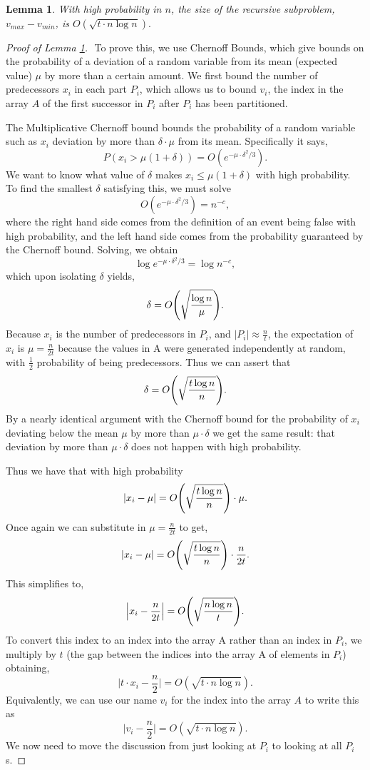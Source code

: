 \documentclass[twocolumn, twoside, 12pt]{article}
\DeclarePairedDelimiter{\paren}{(}{)}
\renewcommand{\paragraph}[1]{\vspace{0.09in}\noindent{\bf \boldmath #1.}}
\newtheorem{lemma}{Lemma}
\begin{document}
\begin{lemma}
With high probability in $n$, the size of the recursive subproblem, $v_{max} - v_{min}$, is $O(\sqrt{t\cdot n\log n}).$
\label{lem:epsSmallFP}
\end{lemma}

\begin{proof}[Proof of Lemma \ref{lem:epsSmallFP}]
$ $\newline
\paragraph{A Single $P_i$}
To prove this, we use Chernoff Bounds, which give bounds on the probability of a deviation of a random variable from its mean (expected value) $\mu$ by more than a certain amount.
We first bound the number of predecessors $x_i$ in each part $P_i$, which allows us to bound $v_i$, the index in the array $A$ of the first successor in $P_i$ after $P_i$ has been partitioned.

The Multiplicative Chernoff bound bounds the probability of a random variable such as $x_i$ deviation by more than $\delta \cdot \mu$ from its mean.
Specifically it says,
$$P(x_i>\mu(1+\delta)) = O(e^{-\mu \cdot \delta^2/3}).
$$
We want to know what value of $\delta$ makes $x_i\leq\mu(1+\delta)$ with high probability.
To find the smallest $\delta$ satisfying this, we must solve 
$$O(e^{-\mu \cdot \delta^2/3}) = n^{-c},$$
where the right hand side comes from the definition of an event being false with high probability, and the left hand side comes from the probability guaranteed by the Chernoff bound.
Solving, we obtain 
$$\log e^{-\mu \cdot \delta^2/3} = \log n^{-c},$$
which upon isolating $\delta$ yields,
$$\delta = O\paren*{\sqrt{\frac{\log n}{\mu}}}.$$
Because $x_i$ is the number of predecessors in $P_i$, and $|P_i| \approx \frac{n}{t}$, the expectation of $x_i$ is $\mu = \frac{n}{2t}$ because the values in A were generated independently at random, with $\frac{1}{2}$ probability of being predecessors.
Thus we can assert that 
$$\delta = O\paren*{\sqrt{\frac{t\log n}{n}}}.$$
By a nearly identical argument with the Chernoff bound for the probability of $x_i$ deviating below the mean $\mu$ by more than $\mu \cdot \delta$ we get the same result: that deviation by more than $\mu \cdot \delta$ does not happen with high probability.

Thus we have that with high probability
$$|x_i - \mu| = O\paren*{\sqrt{\frac{t\log n}{n}}} \cdot \mu.$$
Once again we can substitute in $\mu=\frac{n}{2t}$ to get,
$$|x_i - \mu| = O\paren*{\sqrt{\frac{t\log n}{n}}} \cdot \frac{n}{2t}.$$
This simplifies to,
$$\Big|x_i - \frac{n}{2t}\Big| = O\paren*{\sqrt{\frac{n\log n}{t}}}.$$
To convert this index to an index into the array A rather than an index in $P_i$, we multiply by $t$ (the gap between the indices into the array A of elements in $P_i$) obtaining,
$$\Big|t\cdot x_i - \frac{n}{2}\Big| = O(\sqrt{t\cdot n\log n}).$$
Equivalently, we can use our name $v_i$ for the index into the array $A$ to write this as
$$\Big|v_i - \frac{n}{2}\Big| = O(\sqrt{t\cdot n\log n}).$$
We now need to move the discussion from just looking at $P_i$ to looking at all $P_i$s.


\end{proof}
\end{document}
